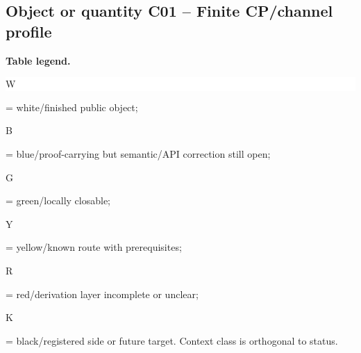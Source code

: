\subsection*{Object or quantity C01 -- Finite CP/\allowbreak{}channel profile}
\hypertarget{objproof:C01}{}
\par\smallskip\noindent\begin{minipage}{0.99\linewidth}\footnotesize\raggedright\textbf{Table legend.} \colorbox{white}{\strut W} = white/finished public object; \colorbox{cyan!20}{\strut B} = blue/proof-carrying but semantic/API correction still open; \colorbox{green!18}{\strut G} = green/locally closable; \colorbox{yellow!25}{\strut Y} = yellow/known route with prerequisites; \colorbox{red!20}{\strut R} = red/derivation layer incomplete or unclear; \colorbox{black!18}{\strut K} = black/registered side or future target. Context class is orthogonal to status.\end{minipage}\par\vspace{0.25em}
